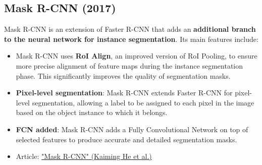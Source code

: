 \subsection{Mask R-CNN (2017)}

Mask R-CNN is an extension of Faster R-CNN that adds an \textbf{additional branch to the neural network for instance segmentation}. Its main features include:

\begin{itemize}
    \item Mask R-CNN uses \textbf{RoI Align}, an improved version of RoI Pooling, to ensure more precise alignment of feature maps during the instance segmentation phase. This significantly improves the quality of segmentation masks.
    \item \textbf{Pixel-level segmentation}: Mask R-CNN extends Faster R-CNN for pixel-level segmentation, allowing a label to be assigned to each pixel in the image based on the object instance to which it belongs.
    \item \textbf{FCN added}: Mask R-CNN adds a Fully Convolutional Network on top of selected features to produce accurate and detailed segmentation masks.
    \item Article: \href{https://arxiv.org/pdf/1703.06870.pdf}{"Mask R-CNN" (Kaiming He et al.)}
\end{itemize}

